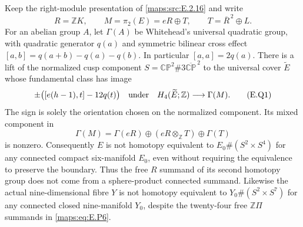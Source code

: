 

Keep the right-module presentation of \ref{maps:src:E.2.16} and write
\[
 R=\mathbb ZK,\qquad M=\pi_2(E)=eR\oplus T,
 \qquad T=\overline R^{\,2}\oplus L.
\]
For an abelian group $A$, let $\Gamma(A)$ be Whitehead's universal
quadratic group, with quadratic generator $q(a)$ and symmetric
bilinear cross effect
$[a,b]=q(a+b)-q(a)-q(b)$.  In particular $[a,a]=2q(a)$.
There is a lift of the normalized cusp component
$S=\mathbb {CP}^2\#3\overline{\mathbb {CP}}^{\,2}$ to the
universal cover $\widetilde E$ whose fundamental class has image
\[
 \pm\bigl([e(h-1),t]-12q(t)\bigr)
       \quad\hbox{under}\quad
 H_4(\widetilde E;\mathbb Z)\longrightarrow\Gamma(M).
 \tag{E.Q1}\label{maps:eq:E.Q1}
\]
The sign is solely the orientation chosen on the normalized
component.  Its mixed component in
\[
 \Gamma(M)=\Gamma(eR)\oplus(eR\otimes_{\mathbb Z}T)
                                      \oplus\Gamma(T)
 \tag{E.Q2}\label{maps:eq:E.Q2}
\]
is nonzero.  Consequently $E$ is not homotopy equivalent to
$E_0\#(S^2\times S^4)$ for any connected compact six-manifold
$E_0$, even without requiring the equivalence to preserve the
boundary.  Thus the free $R$ summand of its second homotopy group
does not come from a sphere-product connected summand.
Likewise the actual nine-dimensional fibre $Y$ is not
homotopy equivalent to $Y_0\#(S^2\times S^7)$ for any
connected closed nine-manifold $Y_0$, despite the twenty-four
free $\mathbb Z\Pi$ summands in \eqref{maps:eq:E.P6}.

